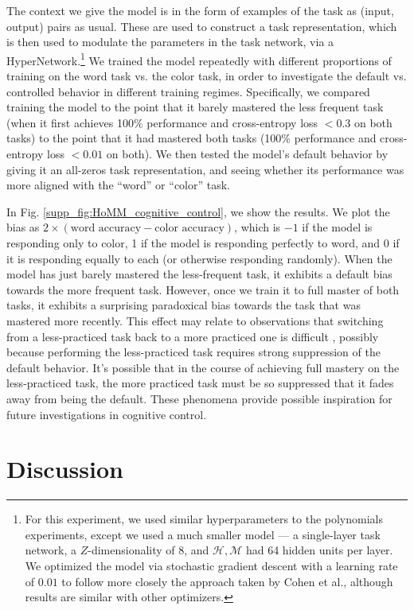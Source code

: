 The context we give the model is in the form of examples of the task as (input, output) pairs as usual. These are used to construct a task representation, which is then used to modulate the parameters in the task network, via a HyperNetwork.\footnote{For this experiment, we used similar hyperparameters to the polynomials experiments, except we used a much smaller model --- a single-layer task network, a $Z$-dimensionality of 8, and $\mathcal{H}, \mathcal{M}$ had 64 hidden units per layer. We optimized the model via stochastic gradient descent with a learning rate of \(0.01\) to follow more closely the approach taken by Cohen et al., although results are similar with other optimizers.} We trained the model repeatedly with different proportions of training on the word task vs. the color task, in order to investigate the default vs. controlled behavior in different training regimes. Specifically, we compared training the model to the point that it barely mastered the less frequent task (when it first achieves 100\% performance and cross-entropy loss \(< 0.3\) on both tasks) to the point that it had mastered both tasks (100\% performance and cross-entropy loss \(<0.01\) on both). We then tested the model's default behavior by giving it an all-zeros task representation, and seeing whether its performance was more aligned with the ``word'' or ``color'' task.

In Fig. \ref{supp_fig:HoMM_cognitive_control}, we show the results. We plot the bias as \(2 \times (\text{word accuracy} - \text{color accuracy})\), which is \(-1\) if the model is responding only to color, 1 if the model is responding perfectly to word, and 0 if it is responding equally to each (or otherwise responding randomly). When the model has just barely mastered the less-frequent task, it exhibits a default bias towards the more frequent task. However, once we train it to full master of both tasks, it exhibits a surprising paradoxical bias towards the task that was mastered more recently. This effect may relate to observations that switching from a less-practiced task back to a more practiced one is difficult \citep{Monsell2003}, possibly because performing the less-practiced task requires strong suppression of the default behavior. It's possible that in the course of achieving full mastery on the less-practiced task, the more practiced task must be so suppressed that it fades away from being the default. These phenomena provide possible inspiration for future investigations in cognitive control.


\section{Discussion}\label{sec:HoMM:discussion}

